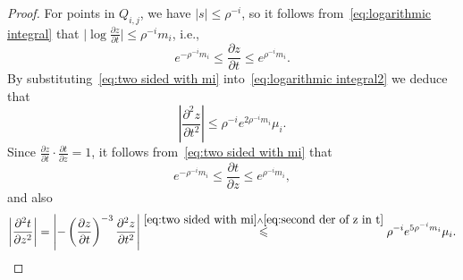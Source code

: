 \documentclass[11pt,reqno]{amsart}
\newcommand{\0}{\mathbf{0}}
\renewcommand{\1}{\mathbf 1}
\renewcommand{\le}{\leqslant}
\theoremstyle{remark}
\begin{document}
\begin{proof}
       For points in $Q_{i,j}$, we have $|s|\le \rho^{-i}$, so it follows from~\eqref{eq:logarithmic integral} that $\bigl|\log \frac{\partial z}{\partial t}\bigr|\le \rho^{-i} m_i$, i.e.,
      \begin{equation}\label{eq:two sided with mi}
      e^{-\rho^{-i}m_i}\le \frac{\partial z}{\partial t}\le e^{\rho^{-i}m_i}.
      \end{equation}
       By substituting~\eqref{eq:two sided with mi} into~\eqref{eq:logarithmic integral2} we deduce that
       \begin{equation}\label{eq:second der of z in t}
       \left|\frac{\partial^2 z}{\partial t^2}\right|\le \rho^{-i}e^{2\rho^{-i}m_i}\mu_i.
       \end{equation}
    Since $\frac{\partial z}{\partial t}\cdot \frac{\partial t}{\partial z}=1$, it follows from~\eqref{eq:two sided with mi} that
   \begin{equation}\label{eq:two sided with mi inverse}
      e^{-\rho^{-i}m_i}\le  \frac{\partial t}{\partial z}\le e^{\rho^{-i}m_i},
      \end{equation}
    and also
    \begin{equation}\label{eq:second t with respect to z}
    \left|\frac{\partial^2 t}{\partial z^2}\right|=\left|-\left(\frac{\partial z}{\partial t}\right)^{-3}\frac{\partial^2 z}{\partial t^2}\right|\stackrel{\eqref{eq:two sided with mi}\wedge \eqref{eq:second der of z in t}}{\le} \rho^{-i}e^{5\rho^{-i}m_i}\mu_i.
    \end{equation}


\end{proof}
\end{document}
